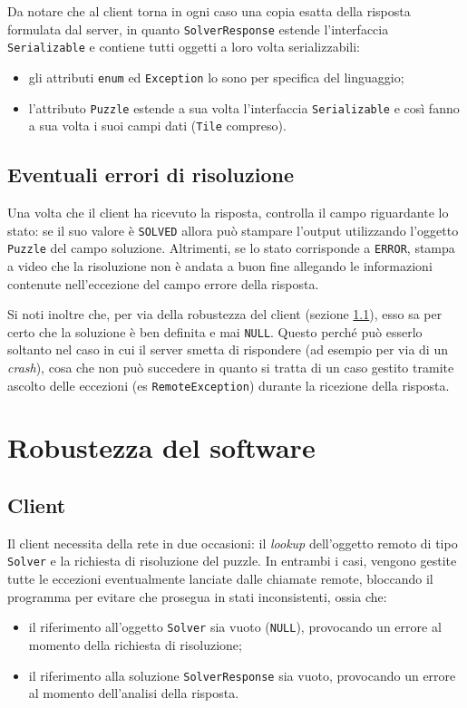 \documentclass[a4paper, 12pt]{article}
\begin{document}
Da notare che al client torna in ogni caso una copia esatta della risposta
formulata dal server, in quanto \verb|SolverResponse| estende l'interfaccia
\verb|Serializable| e contiene tutti oggetti a loro volta serializzabili:
\begin{itemize}
\item gli attributi \verb|enum| ed \verb|Exception| lo sono per specifica del
linguaggio;
\item l'attributo \verb|Puzzle| estende a sua volta l'interfaccia
\verb|Serializable| e così fanno a sua volta i suoi campi dati (\verb|Tile|
compreso).
\end{itemize}
\subsection{Eventuali errori di risoluzione}
Una volta che il client ha ricevuto la risposta, controlla il campo riguardante
lo stato: se il suo valore è \verb|SOLVED| allora può stampare l'output
utilizzando l'oggetto \verb|Puzzle| del campo soluzione. Altrimenti, se lo stato
corrisponde a \verb|ERROR|, stampa a video che la risoluzione non è andata a
buon fine allegando le informazioni contenute nell'eccezione del campo errore
della risposta.

Si noti inoltre che, per via della robustezza del client (sezione
\ref{robust-client}), esso sa per certo che la soluzione è ben definita e
mai \verb|NULL|. Questo perché può esserlo soltanto nel caso in cui il server
smetta di rispondere (ad esempio per via di un \emph{crash}), cosa che non può
succedere in quanto si tratta di un caso gestito tramite ascolto delle eccezioni
(es \verb|RemoteException|) durante la ricezione della risposta.

\section{Robustezza del software}
\subsection{Client}
\label{robust-client}
Il client necessita della rete in due occasioni: il \emph{lookup} dell'oggetto
remoto di tipo \verb|Solver| e la richiesta di risoluzione del puzzle. In
entrambi i casi, vengono gestite tutte le eccezioni eventualmente lanciate dalle
chiamate remote, bloccando il programma per evitare che prosegua in stati
inconsistenti, ossia che:
\begin{itemize}
\item il riferimento all'oggetto \verb|Solver| sia vuoto (\verb|NULL|),
provocando un errore al momento della richiesta di risoluzione;
\item il riferimento alla soluzione \verb|SolverResponse| sia vuoto, provocando
un errore al momento dell'analisi della risposta.
\end{itemize}
\end{document}
